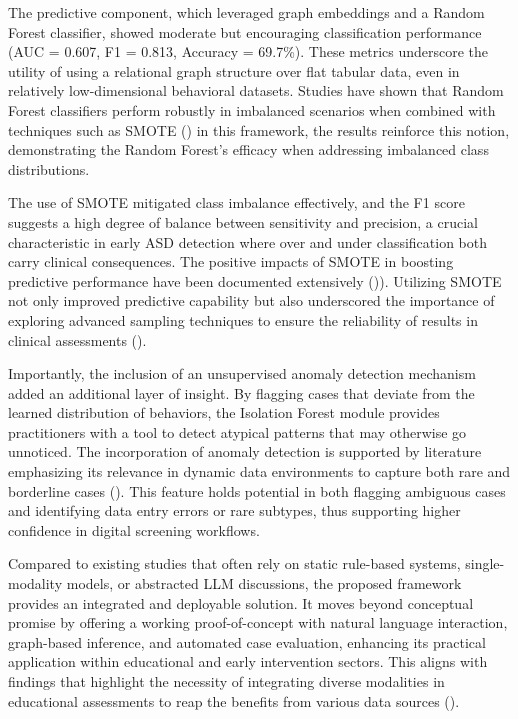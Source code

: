 \documentclass[pdflatex,sn-basic]{sn-jnl}%
\theoremstyle{thmstyleone}%
\theoremstyle{thmstyletwo}%
\theoremstyle{thmstylethree}%
\begin{document}
  The predictive component, which leveraged graph embeddings and a Random Forest classifier, showed moderate but encouraging
  classification performance (AUC = 0.607, F1 = 0.813, Accuracy = 69.7\%). These metrics underscore the utility of using a
  relational graph structure over flat tabular data, even in relatively low-dimensional behavioral datasets. Studies have shown
  that Random Forest classifiers perform robustly in imbalanced scenarios when combined with techniques such as SMOTE
  (\cite{10.20944/preprints202410.1324.v1, 10.11591/ijece.v7i4.pp2215-2222}) in this framework, the results reinforce this
  notion, demonstrating the Random Forest's efficacy when addressing imbalanced class distributions.

  The use of SMOTE mitigated class imbalance effectively, and the F1 score suggests a high degree of balance between sensitivity
  and precision, a crucial characteristic in early ASD detection where over and under classification both carry clinical
  consequences. The positive impacts of SMOTE in boosting predictive performance have been documented extensively (\cite{10.1016/
  j.eswa.2019.113026, 10.30812/matrik.v22i2.2515})). Utilizing SMOTE not only improved predictive capability but also underscored
  the importance of exploring advanced sampling techniques to ensure the reliability of results in clinical assessments
  (\cite{10.5194/nhess-24-1913-2024}).

  Importantly, the inclusion of an unsupervised anomaly detection mechanism added an additional layer of insight. By flagging
  cases that deviate from the learned distribution of behaviors, the Isolation Forest module provides practitioners with a tool
  to detect atypical patterns that may otherwise go unnoticed. The incorporation of anomaly detection is supported by literature
  emphasizing its relevance in dynamic data environments to capture both rare and borderline cases (\cite{10.47065/
  bits.v5i1.3647, 10.26594/register.v5i2.1705}). This feature holds potential in both flagging ambiguous cases and identifying
  data entry errors or rare subtypes, thus supporting higher confidence in digital screening workflows.

  Compared to existing studies that often rely on static rule-based systems, single-modality models, or abstracted LLM
  discussions, the proposed framework provides an integrated and deployable solution. It moves beyond conceptual promise by
  offering a working proof-of-concept with natural language interaction, graph-based inference, and automated case evaluation,
  enhancing its practical application within educational and early intervention sectors. This aligns with findings that highlight
  the necessity of integrating diverse modalities in educational assessments to reap the benefits from various data sources
  (\cite{10.2991/978-94-6463-238-5_35}).
\end{document}
